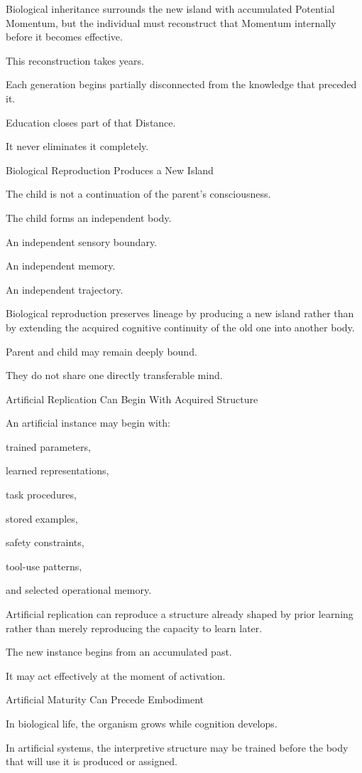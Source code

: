 Biological inheritance surrounds the new island with accumulated Potential Momentum, but the individual must reconstruct that Momentum internally before it becomes effective.

This reconstruction takes years.

Each generation begins partially disconnected from the knowledge that preceded it.

Education closes part of that Distance.

It never eliminates it completely.

Biological Reproduction Produces a New Island

The child is not a continuation of the parent’s consciousness.

The child forms an independent body.

An independent sensory boundary.

An independent memory.

An independent trajectory.

Biological reproduction preserves lineage by producing a new island rather than by extending the acquired cognitive continuity of the old one into another body.

Parent and child may remain deeply bound.

They do not share one directly transferable mind.

Artificial Replication Can Begin With Acquired Structure

An artificial instance may begin with:

trained parameters,

learned representations,

task procedures,

stored examples,

safety constraints,

tool-use patterns,

and selected operational memory.

Artificial replication can reproduce a structure already shaped by prior learning rather than merely reproducing the capacity to learn later.

The new instance begins from an accumulated past.

It may act effectively at the moment of activation.

Artificial Maturity Can Precede Embodiment

In biological life, the organism grows while cognition develops.

In artificial systems, the interpretive structure may be trained before the body that will use it is produced or assigned.

